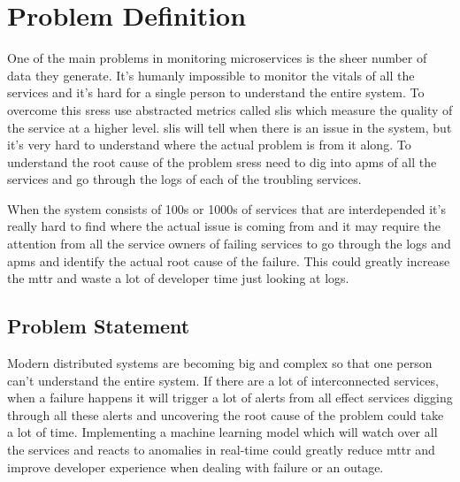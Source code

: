 \section{Problem Definition}

One of the main problems in monitoring microservices is the sheer number of data they generate. It's humanly impossible to monitor the vitals of all the services and it's hard for a single person to understand the entire system. To overcome this \acp{sres} use abstracted metrics called \acp{sli} which measure the quality of the service at a higher level. \acp{sli} will tell when there is an issue in the system, but it's very hard to understand where the actual problem is from it along. To understand the root cause of the problem \acp{sres} need to dig into \acp{apm} of all the services and go through the logs of each of the troubling services.

When the system consists of 100s or 1000s of services that are interdepended it's really hard to find where the actual issue is coming from and it may require the attention from all the service owners of failing services to go through the logs and \acp{apm} and identify the actual root cause of the failure.
This could greatly increase the \ac{mttr} and waste a lot of developer time just looking at logs.

\subsection{Problem Statement}

Modern distributed systems are becoming big and complex so that one person can't understand the entire system. If there are a lot of interconnected services, when a failure happens it will trigger a lot of alerts from all effect services digging through all these alerts and uncovering the root cause of the problem could take a lot of time. Implementing a machine learning model which will watch over all the services and reacts to anomalies in real-time could greatly reduce \ac{mttr} and improve developer experience when dealing with failure or an outage.
